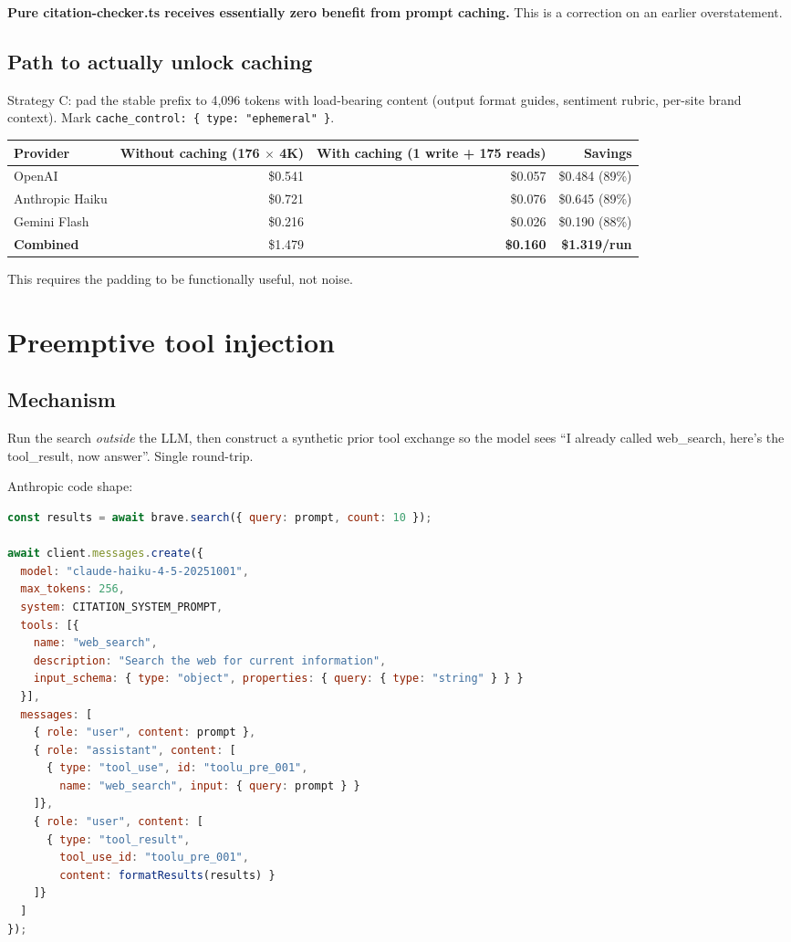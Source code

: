 \documentclass[11pt,letterpaper]{article}
\newcommand{\good}[1]{\textcolor{good}{#1}}
\begin{document}
\textbf{Pure citation-checker.ts receives essentially zero benefit from
prompt caching.} This is a correction on an earlier overstatement.

\subsection{Path to actually unlock caching}

Strategy C: pad the stable prefix to 4,096 tokens with load-bearing content
(output format guides, sentiment rubric, per-site brand context). Mark
\texttt{cache\_control: \{ type: "ephemeral" \}}.

\begin{center}
\begin{tabular}{@{}lrrr@{}}
\toprule
\textbf{Provider} & \textbf{Without caching (176 $\times$ 4K)} & \textbf{With caching (1 write + 175 reads)} & \textbf{Savings} \\
\midrule
OpenAI             & \$0.541 & \$0.057 & \good{\$0.484 (89\%)} \\
Anthropic Haiku    & \$0.721 & \$0.076 & \good{\$0.645 (89\%)} \\
Gemini Flash       & \$0.216 & \$0.026 & \good{\$0.190 (88\%)} \\
\midrule
\textbf{Combined}  & \$1.479 & \textbf{\$0.160} & \good{\textbf{\$1.319/run}} \\
\bottomrule
\end{tabular}
\end{center}

This requires the padding to be functionally useful, not noise.

\section{Preemptive tool injection}

\subsection{Mechanism}

Run the search \textit{outside} the LLM, then construct a synthetic prior
tool exchange so the model sees ``I already called web\_search, here's the
tool\_result, now answer''. Single round-trip.

Anthropic code shape:

\begin{lstlisting}[language=JavaScript]
const results = await brave.search({ query: prompt, count: 10 });

await client.messages.create({
  model: "claude-haiku-4-5-20251001",
  max_tokens: 256,
  system: CITATION_SYSTEM_PROMPT,
  tools: [{
    name: "web_search",
    description: "Search the web for current information",
    input_schema: { type: "object", properties: { query: { type: "string" } } }
  }],
  messages: [
    { role: "user", content: prompt },
    { role: "assistant", content: [
      { type: "tool_use", id: "toolu_pre_001",
        name: "web_search", input: { query: prompt } }
    ]},
    { role: "user", content: [
      { type: "tool_result",
        tool_use_id: "toolu_pre_001",
        content: formatResults(results) }
    ]}
  ]
});
\end{lstlisting}
\end{document}

